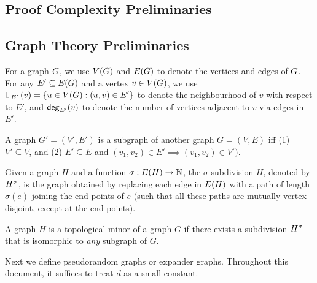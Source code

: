 \documentclass[11pt]{article}
\begin{document}
\subsection{Proof Complexity Preliminaries}
\label{sec:proof-system-prelims}
\begin{definition}\label{def:poly-calc-refutations}
	
\end{definition}

\subsection{Graph Theory Preliminaries}

For a graph $G$, we use $V(G)$ and $E(G)$ to denote the vertices and edges of $G$. 
For any $E' \subseteq E(G)$ and a vertex $v \in V(G)$, we use $\Gamma_{E'}\left(v\right) = \{ u \in V(G) : (u,v) \in E' \}$ to denote the neighbourhood of $v$ with respect to $E'$, and $\mathsf{deg}_{E'}(v)$ to denote the number of vertices adjacent to $v$ via edges in $E'$.

\begin{definition}[Subgraph]\label{def:subgraph}
A graph $G'=(V', E')$ is a subgraph of another graph $G=(V, E)$ iff (1) $V'\subseteq V$, and (2) $E'\subseteq E$ and  $(v_1, v_2) \in E' \implies (v_1, v_2) \in V')$.
	
\end{definition}

\begin{definition}\label{def:subdivisions}
Given a graph $H$ and a function $\sigma: E(H) \rightarrow \mathbb{N}$, the $\sigma$-subdivision $H$, denoted by ${H}^{\sigma}$, is the graph obtained by replacing each edge in $E(H)$ with a path of length $\sigma(e)$ joining the end points of $e$ (such that all these paths are mutually vertex disjoint, except at the end points).	
\end{definition}

\begin{definition}\label{def:topological-minor}
A graph $H$ is a topological minor of a graph $G$ if there exists a subdivision ${H}^{\sigma}$ that is isomorphic to \emph{any} subgraph of $G$.	
\end{definition}

Next we define pseudorandom graphs or expander graphs. 
Throughout this document, it suffices to treat $d$ as a small constant.
\end{document}
